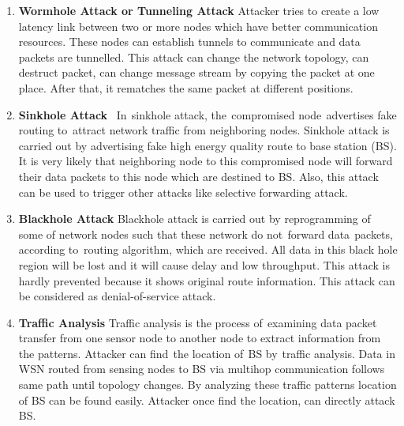\begin{enumerate}[label=\textbf{\roman*.}]
    \item \textbf{Wormhole Attack or Tunneling Attack} \cite{singh2014survey} Attacker tries to create a low latency link between two or more nodes which have better communication resources. These nodes can establish tunnels to communicate and data packets are tunnelled. This attack can change the network topology, can destruct packet, can change message stream by copying the packet at one place. After that, it rematches the same packet at different positions.
    
    \item \textbf{Sinkhole Attack\textcolor{white}{e}}\cite{salehi2013detection} In\textcolor{white}{e}sinkhole attack, the\textcolor{white}{e}compromised node\textcolor{white}{e}advertises fake routing to\textcolor{white}{e}attract network traffic from neighboring nodes. Sinkhole attack is carried out by advertising fake high energy quality route to base station (BS). It is very likely that neighboring node to this compromised node will forward their data packets to this node which are destined to BS. Also, this attack can be used to trigger other attacks like selective forwarding attack. 

    \item \textbf{Blackhole Attack }\cite{wazid2013detection} Blackhole attack is carried out by reprogramming of some of network nodes such that these network do not\textcolor{white}{e}forward data\textcolor{white}{e}packets, according to\textcolor{white}{e}routing algorithm, which are received. All data in this black hole region will be lost and it will cause delay and low throughput. This attack is hardly prevented because it shows original route information. This attack can be considered as denial-of-service attack.
    
    
    \item \textbf{Traffic Analysis }\cite{deng2005countermeasures} Traffic analysis is the process of\textcolor{white}{e}examining data packet transfer from one sensor node to another node to extract information from the patterns. Attacker can find\textcolor{white}{e}the location of\textcolor{white}{e}BS by\textcolor{white}{e}traffic analysis. Data in WSN routed from sensing nodes to BS via multihop communication follows same path until topology changes. By analyzing these traffic patterns location of BS can be found easily. Attacker once find the location, can directly attack BS.
    

\end{enumerate}
